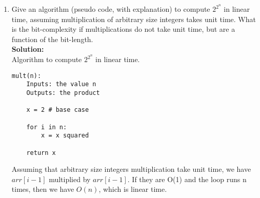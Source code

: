 \documentclass{article}
\begin{document}
    \begin{enumerate}[label=\textbf{Q1}]
        \item Give an algorithm (pseudo code, with explanation) to compute $2^{2^n}$ in linear time, assuming multiplication of arbitrary size integers takes unit time. What is the bit-complexity if multiplications do not take unit time, but are a function of the bit-length. \\
        \textbf{Solution:}\\
        Algorithm to compute $2^{2^n}$ in linear time.
        \begin{verbatim}
mult(n):
    Inputs: the value n
    Outputs: the product

    x = 2 # base case

    for i in n:
        x = x squared
    
    return x
        \end{verbatim}
        Assuming that arbitrary size integers multiplication take unit time,
        we have $arr[i-1]$ multiplied by $arr[i-1]$. If they are O(1) and the
        loop runs n times, then we have $O(n)$, which is linear time.

    \end{enumerate}
\end{document}
